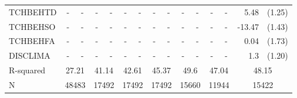 \documentclass[10pt]{article}
\begin{document}
\begin{table}[htbp]
\begin{tabular}{lrlrlrlrlrlrlrl}
    TCHBEHTD & \multicolumn{1}{c}{-} & \multicolumn{1}{c}{-} & \multicolumn{1}{c}{-} & \multicolumn{1}{c}{-} & \multicolumn{1}{c}{-} & \multicolumn{1}{c}{-} & \multicolumn{1}{c}{-} & \multicolumn{1}{c}{-} & \multicolumn{1}{c}{-} & \multicolumn{1}{c}{-} & \multicolumn{1}{c}{-} & \multicolumn{1}{c}{-} & 5.48  & (1.25) \\
    TCHBEHSO & \multicolumn{1}{c}{-} & \multicolumn{1}{c}{-} & \multicolumn{1}{c}{-} & \multicolumn{1}{c}{-} & \multicolumn{1}{c}{-} & \multicolumn{1}{c}{-} & \multicolumn{1}{c}{-} & \multicolumn{1}{c}{-} & \multicolumn{1}{c}{-} & \multicolumn{1}{c}{-} & \multicolumn{1}{c}{-} & \multicolumn{1}{c}{-} & -13.47 & (1.43) \\
    TCHBEHFA & \multicolumn{1}{c}{-} & \multicolumn{1}{c}{-} & \multicolumn{1}{c}{-} & \multicolumn{1}{c}{-} & \multicolumn{1}{c}{-} & \multicolumn{1}{c}{-} & \multicolumn{1}{c}{-} & \multicolumn{1}{c}{-} & \multicolumn{1}{c}{-} & \multicolumn{1}{c}{-} & \multicolumn{1}{c}{-} & \multicolumn{1}{c}{-} & 0.04  & (1.73) \\
    DISCLIMA & \multicolumn{1}{c}{-} & \multicolumn{1}{c}{-} & \multicolumn{1}{c}{-} & \multicolumn{1}{c}{-} & \multicolumn{1}{c}{-} & \multicolumn{1}{c}{-} & \multicolumn{1}{c}{-} & \multicolumn{1}{c}{-} & \multicolumn{1}{c}{-} & \multicolumn{1}{c}{-} & \multicolumn{1}{c}{-} & \multicolumn{1}{c}{-} & 1.3   & (1.20) \\
    R-squared    & \multicolumn{2}{c}{27.21} & \multicolumn{2}{c}{41.14} & \multicolumn{2}{c}{42.61} & \multicolumn{2}{c}{45.37} & \multicolumn{2}{c}{49.6} & \multicolumn{2}{c}{47.04} & \multicolumn{2}{c}{48.15} \\
    N     & \multicolumn{2}{c}{48483} & \multicolumn{2}{c}{17492} & \multicolumn{2}{c}{17492} & \multicolumn{2}{c}{17492} & \multicolumn{2}{c}{15660} & \multicolumn{2}{c}{11944} & \multicolumn{2}{c}{15422} \\
    \bottomrule
    \end{tabular}%
  \label{tab:addlabel}%
\end{table}%
\end{document}
